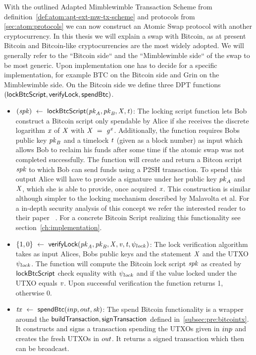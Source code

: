 With the outlined Adapted Mimblewimble Transaction Scheme from definition~\ref{def:atom:apt-ext-mw-tx-scheme} and protocols from \ref{sec:atom:protocols} we can now construct an Atomic Swap protocol with another cryptocurrency.
In this thesis we will explain a swap with Bitcoin, as at present Bitcoin and Bitcoin-like cryptocurrencies are the most widely adopted.
We will generally refer to the ``Bitcoin side`` and the ``Mimblewimble side`` of the swap to be most generic.
Upon implementation one has to decide for a specific implementation, for example BTC on the Bitcoin side and Grin on
the Mimblewimble side.
On the Bitcoin side we define three DPT functions $(\mathsf{lockBtcScript}, \mathsf{verifyLock}, \mathsf{spendBtc})$.
\begin{itemize}
    \item $(\mathit{spk}) ~\leftarrow~ \mathsf{lockBtcScript} (\mathit{pk}_{\mathit{A}},\mathit{pk}_{\mathit{B}},\mathit{X},\mathit{t})$:
    The locking script function lets Bob construct a Bitcoin script only spendable by Alice if she receives the discrete logarithm $\mathit{x}$ of $\mathit{X}$ with $\mathit{X} ~=~ \mathit{g}^{\mathit{x}}$.
    Additionally, the function requires Bobs public key $\mathit{pk}_{\mathit{B}}$ and a timelock $\mathit{t}$ (given as a block number) as input which allows Bob to reclaim his funds after some time if the atomic swap was not completed successfully.
    The function will create and return a Bitcon script $\mathit{spk}$ to which Bob can send funds using a P2SH transaction.
    To spend this output Alice will have to provide a signature under her public key $\mathit{pk}_{\mathit{A}}$ and $\mathit{X}$, which she is able to provide, once acquired $\mathit{x}$.
    This construction is similar although simpler to the locking mechanism described by Malavolta et al.
    For a in-depth security analysis of this concept we refer the interested reader to their paper ~\cite{malavolta2019anonymous}.
    For a concrete Bitcoin Script realizing this functionality see section~\ref{ch:implementation}.
    \item $\{ 1,0 \} ~\leftarrow~ \mathsf{verifyLock} (\mathit{pk}_{\mathit{A}},\mathit{pk}_{\mathit{B}},\mathit{X},\mathit{v},\mathit{t},\psi_{lock})$:
    The lock verification algorithm takes as input Alices, Bobs public keys and the statement $\mathit{X}$ and the UTXO $\psi_{lock}$.
    The function will compute the Bitcoin lock script $\mathit{spk}$ as created by $\mathsf{lockBtcScript}$ check equality with $\psi_{lock}$ and if the value locked under the UTXO equals $\mathit{v}$.
    Upon successful verification the function returns 1, otherwise 0.
    \item $\mathit{tx} ~\leftarrow~ \mathsf{spendBtc}(inp,out,\mathit{sk})$:
    The spend Bitcoin functionality is a wrapper around the $\mathsf{buildTransaction}, \mathsf{signTransaction}$ defined in~\ref{subsec:pre:bitcointx}.
    It constructs and signs a transaction spending the UTXOs given in $inp$ and creates the fresh UTXOs in $out$.
    It returns a signed transaction which then can be broadcast.
\end{itemize}

